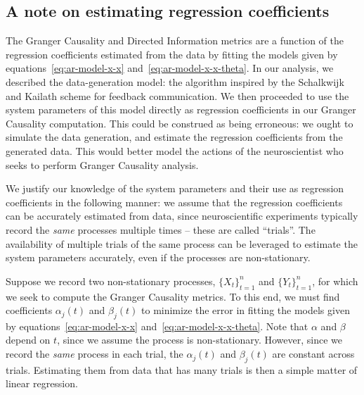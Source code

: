 \documentclass[letterpaper, 10pt, conference]{ieeeconf}
\begin{document}

\subsection{A note on estimating regression coefficients}
\label{sec:estimating-ar-coeffs}

The Granger Causality and Directed Information metrics are a function of the regression coefficients estimated from the data by fitting the models given by equations~\ref{eq:ar-model-x-x} and~\ref{eq:ar-model-x-x-theta}. In our analysis, we described the data-generation model: the algorithm inspired by the Schalkwijk and Kailath scheme for feedback communication. We then proceeded to use the system parameters of this model directly as regression coefficients in our Granger Causality computation. This could be construed as being erroneous: we ought to simulate the data generation, and estimate the regression coefficients from the generated data. This would better model the actions of the neuroscientist who seeks to perform Granger Causality analysis.

We justify our knowledge of the system parameters and their use as regression coefficients in the following manner: we assume that the regression coefficients can be accurately estimated from data, since neuroscientific experiments typically record the \emph{same} processes multiple times -- these are called ``trials''. The availability of multiple trials of the same process can be leveraged to estimate the system parameters accurately, even if the processes are non-stationary.

Suppose we record two non-stationary processes, $\{X_t\}_{t=1}^n$ and $\{Y_t\}_{t=1}^n$, for which we seek to compute the Granger Causality metrics. To this end, we must find coefficients $\alpha_j(t)$ and $\beta_j(t)$ to minimize the error in fitting the models given by equations~\ref{eq:ar-model-x-x} and~\ref{eq:ar-model-x-x-theta}. Note that $\alpha$ and $\beta$ depend on $t$, since we assume the process is non-stationary. However, since we record the \emph{same} process in each trial, the $\alpha_j(t)$ and $\beta_j(t)$ are constant across trials. Estimating them from data that has many trials is then a simple matter of linear regression.
\end{document}
